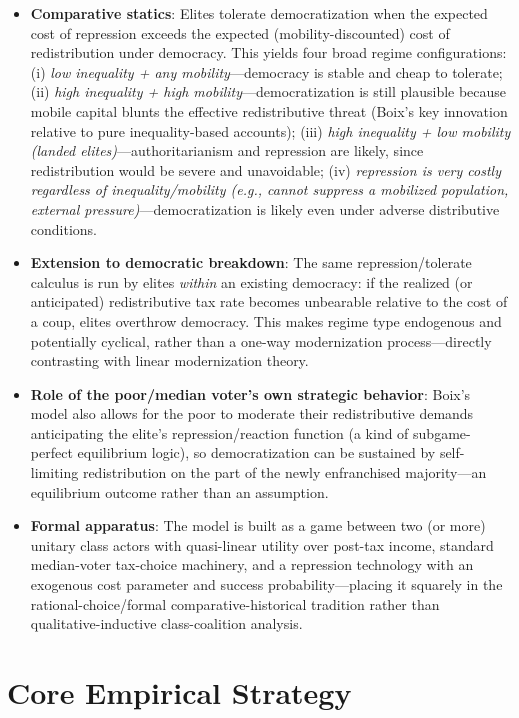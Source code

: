 \documentclass[12pt]{article}
\begin{document}
\begin{itemize}[leftmargin=*, itemsep=4pt]
    \item \textbf{Comparative statics}: Elites tolerate democratization when the expected cost of repression exceeds the expected (mobility-discounted) cost of redistribution under democracy. This yields four broad regime configurations: (i) \emph{low inequality + any mobility}---democracy is stable and cheap to tolerate; (ii) \emph{high inequality + high mobility}---democratization is still plausible because mobile capital blunts the effective redistributive threat (Boix's key innovation relative to pure inequality-based accounts); (iii) \emph{high inequality + low mobility (landed elites)}---authoritarianism and repression are likely, since redistribution would be severe and unavoidable; (iv) \emph{repression is very costly regardless of inequality/mobility (e.g., cannot suppress a mobilized population, external pressure)}---democratization is likely even under adverse distributive conditions.
    \item \textbf{Extension to democratic breakdown}: The same repression/tolerate calculus is run by elites \emph{within} an existing democracy: if the realized (or anticipated) redistributive tax rate becomes unbearable relative to the cost of a coup, elites overthrow democracy. This makes regime type endogenous and potentially cyclical, rather than a one-way modernization process---directly contrasting with linear modernization theory.
    \item \textbf{Role of the poor/median voter's own strategic behavior}: Boix's model also allows for the poor to moderate their redistributive demands anticipating the elite's repression/reaction function (a kind of subgame-perfect equilibrium logic), so democratization can be sustained by self-limiting redistribution on the part of the newly enfranchised majority---an equilibrium outcome rather than an assumption.
    \item \textbf{Formal apparatus}: The model is built as a game between two (or more) unitary class actors with quasi-linear utility over post-tax income, standard median-voter tax-choice machinery, and a repression technology with an exogenous cost parameter and success probability---placing it squarely in the rational-choice/formal comparative-historical tradition rather than qualitative-inductive class-coalition analysis.
\end{itemize}

\section{Core Empirical Strategy}
\end{document}

